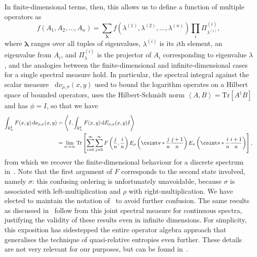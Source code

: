 \documentclass[10pt, a4paper]{article}
\numberwithin{equation}{section} %
\theoremstyle{definition}
\theoremstyle{plain}
\newcommand{\dif}{\mathop{}\!\mathrm{d}} %
\newcommand{\?}{\mathrel{?}} %
\newcommand{\R}{\mathbb{R}} %
\newcommand{\cvec}[1]{\boldsymbol{\mathbf{#1}}}    %
\newcommand{\angleb}[1]{\left\langle #1 \right\rangle} %
\newcommand{\Tr}{\mathrm{Tr}} %
\begin{document}
\begin{appendices}
      In finite-dimensional terms, then, this allows us to define a function of multiple operators as
      \[f(A_1, A_2, \ldots, A_n) = \sum_{\cvec{\lambda}} f(\lambda^{(1)}, \lambda^{(2)}, \ldots, \lambda^{(n)}) \prod_i \Pi^{(i)}_{\lambda^{(i)}}, \]
      where \(\cvec{\lambda}\) ranges over all tuples of eigenvalues, \(\lambda^{(i)}\) is its \(i\)th element, an eigenvalue from \(A_i\), and \(\Pi^{(i)}_{\lambda}\) is the projector of \(A_i\) corresponding to eigenvalue \(\lambda\), and the analogies between the finite-dimensional and infinite-dimensional cases for a single spectral measure hold. In particular, the spectral integral against the scalar measure \(\dif{\nu_{\rho,\sigma}(x,y)}\) used to bound the logarithm operates on a Hilbert space of bounded operators, uses the Hilbert-Schmidt norm \(\angleb{A, B} = \Tr\left[A^{\dagger}B\right]\) and has \(\phi = I\), so that we have
      \begin{align*}
        \int_{\R_+^{2}} F(x,y) \dif{\nu_{\rho,\sigma}(x,y)} &= \angleb{I, \int_{\R_+^{2}} F(x,y) \dif{E_{\rho,\sigma}(x,y)} I} \\
                                                            &= \lim_{n\to\infty} \Tr\left[ \sum_{i=0}^{\infty}\sum_{j=0}^{\infty} F\left(\frac{j}{n}, \frac{i}{n}\right) E_{\rho}\left(\cointv*{\frac{j}{n}}{\frac{j+1}{n}}\right)
                                                            E_{\sigma}\left(\cointv*{\frac{i}{n}}{\frac{i+1}{n}}\right) \right],
      \end{align*}
      from which we recover the finite-dimensional behaviour for a discrete spectrum in~. Note that the first argument of \(F\) corresponds to the second state involved, namely \(\sigma\): this confusing ordering is unfortunately unavoidable, because \(\sigma\) is associated with left-multiplication and \(\rho\) with right-multiplication. We have elected to maintain the notation of~\cite{BFF_QRE} to avoid further confusion. The same results as discussed in~ follow from this joint spectral measure for continuous spectra, justifying the validity of these results even in infinite dimensions. For simplicity, this exposition has sidestepped the entire operator algebra approach that generalises the technique of quasi-relative entropies even further. These details are not very relevant for our purposes, but can be found in~\cite{BFF_QRE}.

    \end{appendices}

    
\end{document}
